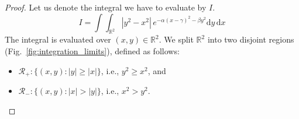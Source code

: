 \documentclass[journal]{IEEEtran}
\theoremstyle{plain}
\theoremstyle{definition}
\theoremstyle{remark}
\newcommand{\R}{\mathbb{R}}
\newcommand{\dd}{\mathrm{d}}
\begin{document}
\begin{proof}
Let us denote the integral we have to evaluate by $I$.
\begin{equation}
    I = \int \int_{\R^2} \left|y^2-x^2\right| \, e^{-\alpha(x-\gamma)^2-\beta y^2} \dd y \, \dd x
\end{equation}
The integral is evaluated over $(x, y) \in \R^2$. We split $\R^2$ into two disjoint regions (Fig.~\ref{fig:integration_limits}), defined as follows:
\begin{itemize}
    \item $\mathcal{R}_+ : \{(x, y) : |y| \geq |x| \}$, i.e., $y^2\geq x^2$, and
    \item $\mathcal{R}_- : \{(x, y) : |x| > |y| \}$, i.e., $x^2 > y^2$.
\end{itemize}




\end{proof}
\end{document}
